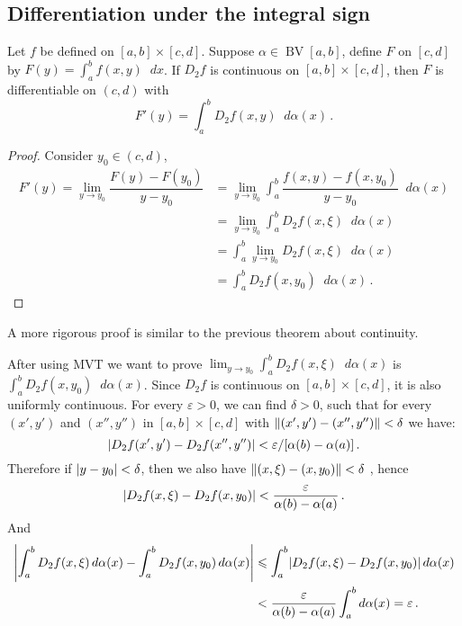 \documentclass{article}
\DeclarePairedDelimiter\abs{\lvert}{\rvert}
\DeclarePairedDelimiter\norm{\lVert}{\rVert}
\newcommand{\dd}{\mathop{}\!d}
\DeclareMathOperator{\BV}{BV}
\begin{document}
\subsection{Differentiation under the integral sign}
\begin{theorem}
    Let $ f $ be defined on $ [a, b] \times [c, d] $. Suppose $ \alpha \in \BV[a, b] $, define $ F $ on $ [c, d] $ by $ F(y) = \int_a^b f(x, y) \dd x $. If $ D_2 f $ is continuous on $ [a, b] \times [c, d] $, then $ F $ is differentiable on $ (c, d) $ with
    \[ 
        F'(y) = \int_a^b D_2 f(x, y) \dd \alpha(x) \,.
    \]
\end{theorem}

\begin{proof}
    Consider $ y_0 \in (c, d) $,
    \begin{align*}
        F'(y) = \lim_{y \to y_0} \dfrac{F(y) - F(y_0)}{y - y_0} &= \lim_{y \to y_0} \int_a^b \dfrac{f(x, y) - f(x, y_0)}{y - y_0} \dd \alpha(x) \\
        &= \lim_{y \to y_0} \int_a^b D_2 f(x, \xi) \dd \alpha(x) \\
        &= \int_a^b \lim_{y \to y_0} D_2 f(x, \xi) \dd \alpha(x) \\
        &= \int_a^b D_2 f(x, y_0) \dd \alpha(x) \,.
    \end{align*}
\end{proof}

A more rigorous proof is similar to the previous theorem about continuity.

After using MVT we want to prove $ \lim_{y\to y_0} \int_a^b D_2 f(x, \xi) \dd \alpha(x) $ is $ \int_a^b D_2 f(x, y_0) \dd \alpha(x) $. Since $ D_2 f $ is continuous on $ [a, b] \times [c, d] $, it is also uniformly continuous. For every $ \varepsilon > 0 $, we can find $ \delta > 0 $, such that for every $ (x', y') $ and $ (x'', y'') $ in $ [a, b] \times [c, d] $ with $ \norm{(x', y') - (x'', y'')} < \delta $ we have:
\[ 
    \abs{ D_2 f(x', y') - D_2 f(x'', y'') } < \varepsilon / [\alpha(b) - \alpha(a)] \,.
\]
Therefore if $ \abs{ y - y_0 } < \delta $, then we also have $ \norm{(x, \xi) - (x, y_0)} < \delta $ , hence
\[ 
    \abs{ D_2 f(x, \xi) - D_2 f(x, y_0) } < \dfrac{\varepsilon}{\alpha(b) - \alpha(a)} \,.
\]
And
\begin{align*}
    \abs*{ \int_a^b D_2 f(x, \xi) \dd \alpha(x) - \int_a^b D_2 f(x, y_0) \dd \alpha(x) } &\leqslant \int_a^b \abs{ D_2 f(x, \xi) - D_2 f(x, y_0) } \dd \alpha(x) \\ 
    &< \dfrac{\varepsilon}{\alpha(b) - \alpha(a)} \int_a^b \dd \alpha(x) = \varepsilon \,.
\end{align*}
\end{document}
